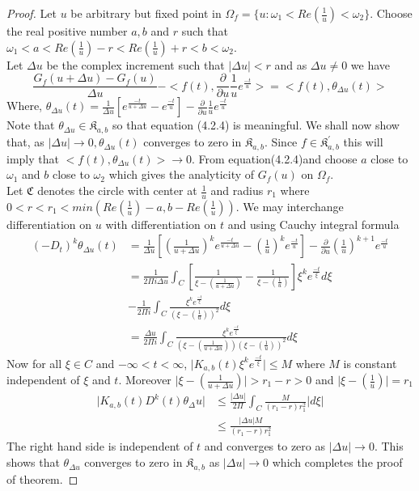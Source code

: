\begin{proof}
 Let $u$ be arbitrary but fixed point in           $\Omega_{f}=\lbrace  u:\omega_{1}<Re(\frac{1}{u})<\omega_{2}\rbrace$. Choose the real positive number $a,b$ and $r$ such that
$\omega_{1}<a<Re(\frac{1}{u})-r<Re(\frac{1}{u})+r<b<\omega_{2}$.\\
Let $\Delta{u}$ be the complex increment such that $\vert\Delta{u}\vert<r$ and as $\Delta{u}\neq0$ we have
\begin{equation}
\frac{ G_{f}(u+\Delta{u})-G_{f}(u)}{\Delta{u}}-<f(t),\frac{\partial}{\partial{u}}\frac{1}{u}e^{\frac{-t}{u}}>=<f(t),\theta_{\Delta{u}}(t)>
\end{equation}
Where, $\theta_{\Delta{u}}(t)=\frac{1}{\Delta{u}}[e^{\frac{-t}{u+\Delta{u}}}-e^{\frac{-t}{u}}]-\frac{\partial}{\partial{u}}\frac{1}{u}e^{\frac{-t}{u}}$\\
Note that $\theta_{\Delta{u}}\in \mathfrak{K}_{a,b}$ so that equation (4.2.4) is meaningful. We shall now show that, as $\vert\Delta{u}\vert\rightarrow 0,   \theta_{\Delta{u}}(t)$ converges to zero in $\mathfrak{K}_{a,b}$. Since $f\in \mathfrak{K}_{a,b}^{'}$ this will imply that $ <f(t),\theta_{\Delta{u}}(t)>\rightarrow 0$. From equation(4.2.4)and choose $a$ close to $\omega_{1}$ and $b$ close to $\omega_{2}$ which gives the analyticity of $G_{f}(u)$ on $\Omega_{f}$.\\
Let $\mathfrak{C}$ denotes the circle with center at $\frac{1}{u}$ and radius $r_{1}$ where $0<r<r_{1}<min(Re(\frac{1}{u})-a,b-Re(\frac{1}{u}))$. We may interchange differentiation on $u$ with differentiation on $t$ and using Cauchy integral formula 
\begin{align*}
(-D_{t})^{k}\theta_{\Delta{u}}(t)&=\frac{1}{\Delta{u}}[(\frac{1}{u+\Delta{u}})^{k}e^{\frac{-t}{u+\Delta{u}}}-(\frac{1}{u})^{k}e^{\frac{-t}{u}}]-\frac{\partial}{\partial{u}}(\frac{1}{u})^{k+1}e^{\frac{-t}{u}}\\
&= \frac{1}{2\Pi i\Delta{u}}\int_{C}[\frac{1}{\xi-(\frac{1}{u+\Delta{u}})}-\frac{1}{\xi-(\frac{1}{u})}]\xi^{k}e^{\frac{-t}{\xi}}d\xi\\
&-\frac{1}{2\Pi i}\int_{C}\frac{\xi^{k}e^{\frac{-t}{\xi}}}{(\xi-(\frac{1}{u}))^{2}}d\xi\\
&=\frac{\Delta{u}}{2\Pi i}\int_{C}\frac{\xi^{k}e^{\frac{-t}{\xi}}}{(\xi-(\frac{1}{u+\Delta{u}}))(\xi-(\frac{1}{u}))^{2}}d\xi
\end{align*}
Now for all $\xi\in C $ and $-\infty<t<\infty$,
$\vert K_{a,b}(t)\xi^{k}e^{\frac{-t}{\xi}}\vert\leq M$ where $M$ is constant independent of $\xi$ and $t$. Moreover $\vert\xi-(\frac{1}{u+\Delta{u}})\vert>r_{1}-r>0$ and $\vert\xi-(\frac{1}{u})\vert =r_{1}$
\begin{align*}
 \vert K_{a,b}(t)D^{k}(t)\theta_\Delta{u}\vert&\leq\frac{\vert\Delta{u}\vert}{2\Pi}\int_{C}\frac{M}{(r_{1}-r)r_{1}^{2}} \vert d\xi\vert\\
 &\leq\frac{\vert\Delta{u}\vert M}{(r_{1}-r)r_{1}^{2}}
\end{align*}
 The right hand side is independent of $t$ and converges to zero as $\vert\Delta{u}\vert\rightarrow 0$. This shows that $\theta_{\Delta{u}}$ converges to zero in $\mathfrak{K}_{a,b}$ as $\vert\Delta{u}\vert\rightarrow 0$ which completes the proof of theorem.
 \end{proof}
